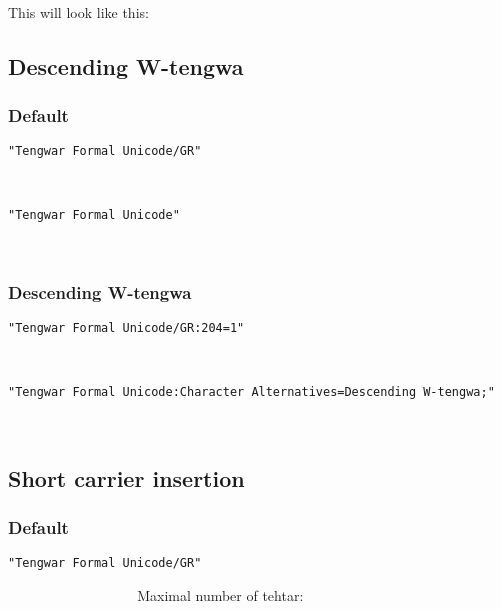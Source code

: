 \documentclass[11pt,a4paper]{article}
\begin{document}
\paragraph{} This will look like this: \myformal   \normalfont


\subsection{Descending W-tengwa}

\subsubsection{Default}

\noindent \texttt{"Tengwar Formal Unicode/GR"}

\formalGR  

\noindent \texttt{"Tengwar Formal Unicode"}

\formalAAT  

\subsubsection{Descending W-tengwa}

\texttt{"Tengwar Formal Unicode/GR:204=1"}

\formalGRdescw  

\noindent \texttt{"Tengwar Formal Unicode:Character Alternatives=Descending W-tengwa;"}

\formalAATdescw  


\subsection{Short carrier insertion}

\subsubsection{Default}

\noindent \texttt{"Tengwar Formal Unicode/GR"}

\newcommand{\combinationsrow}[1]{#1 & #1 & #1 & #1 & #1 & #1 & #1 & #1 & #1 \\}

\formalGR      \normalfont Maximal number of tehtar:
\formalGR 

\end{document}
